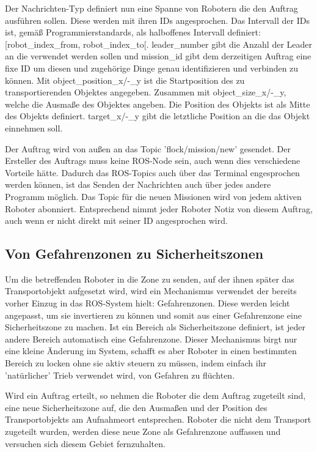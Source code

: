 Der Nachrichten-Typ definiert nun eine Spanne von Robotern die den Auftrag ausführen sollen. Diese werden mit ihren IDs angesprochen. Das Intervall der IDs ist, gemäß Programmierstandards, als halboffenes Intervall definiert: [robot\_index\_from, robot\_index\_to[.
leader\_number gibt die Anzahl der Leader an die verwendet werden sollen und mission\_id gibt dem derzeitigen Auftrag eine fixe ID um diesen und zugehörige Dinge genau identifizieren und verbinden zu können.
Mit object\_position\_x/-\_y ist die Startposition des zu transportierenden Objektes angegeben. Zusammen mit object\_size\_x/-\_y, welche die Ausmaße des Objektes angeben. Die Position des Objekts ist als Mitte des Objekts definiert.
target\_x/-\_y gibt die letztliche Position an die das Objekt einnehmen soll.

Der Auftrag wird von außen an das Topic 'flock/mission/new' gesendet. Der Ersteller des Auftrags muss keine ROS-Node sein, auch wenn dies verschiedene Vorteile hätte. Dadurch das ROS-Topics auch über das Terminal engesprochen werden können, ist das Senden der Nachrichten auch über jedes andere Programm möglich. Das Topic für die neuen Missionen wird von jedem aktiven Roboter abonniert. Entsprechend nimmt jeder Roboter Notiz von diesem Auftrag, auch wenn er nicht direkt mit seiner ID angesprochen wird.

\subsection*{Von Gefahrenzonen zu Sicherheitszonen}

Um die betreffenden Roboter in die Zone zu senden, auf der ihnen später das Transportobjekt aufgesetzt wird, wird ein Mechanismus verwendet der bereits vorher Einzug in das ROS-System hielt: Gefahrenzonen. Diese werden leicht angepasst, um sie invertieren zu können und somit aus einer Gefahrenzone eine Sicherheitszone zu machen. Ist ein Bereich als Sicherheitszone definiert, ist jeder andere Bereich automatisch eine Gefahrenzone.
Dieser Mechanismus birgt nur eine kleine Änderung im System, schafft es aber Roboter in einen bestimmten Bereich zu locken ohne sie aktiv steuern zu müssen, indem einfach ihr 'natürlicher' Trieb verwendet wird, von Gefahren zu flüchten.

Wird ein Auftrag erteilt, so nehmen die Roboter die dem Auftrag zugeteilt sind, eine neue Sicherheitszone auf, die den Ausmaßen und der Position des Transportobjekts am Aufnahmeort entsprechen. Roboter die nicht dem Transport zugeteilt wurden, werden diese neue Zone als Gefahrenzone auffassen und versuchen sich diesem Gebiet fernzuhalten.

